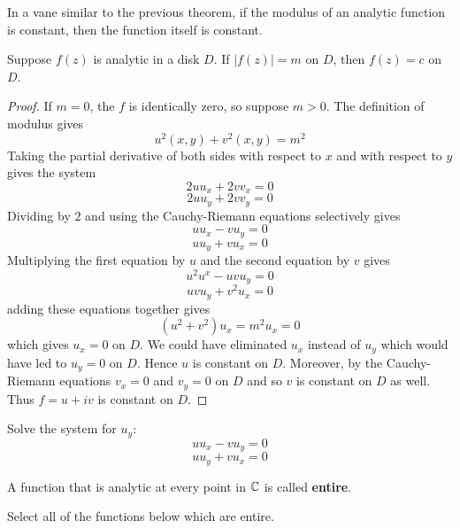 \documentclass[handout]{ximera}
\begin{document}
In a vane similar to the previous theorem, if the modulus of an analytic function is constant, 
then the function itself is constant.

\begin{theorem}
Suppose $f(z)$ is analytic in a disk $D$. If $|f(z)| = m$ on  $D$, then $f(z) =c$ on $D$.
\end{theorem}

\begin{proof}
If $m =0$, the $f$ is identically zero, so suppose $m>0$. The definition of modulus gives
\[
u^2(x,y) + v^2(x,y) = m^2
\]
Taking the partial derivative of both sides with respect to $x$ and with respect to $y$ gives the system
\[
2uu_x +2vv_x = 0
\]
\[
2uu_y + 2vv_y = 0
\]
Dividing by $2$ and using the Cauchy-Riemann equations selectively gives
\[
uu_x -vu_y = 0
\]
\[
uu_y + vu_x = 0
\]
Multiplying the first equation by $u$ and the second equation by $v$ gives
\[
u^2u^x - uvu_y=0
\]
\[
uvu_y + v^2u_x = 0
\]
adding these equations together gives
\[
\left(u^2 +v^2\right)u_x = m^2u_x = 0
\]
which gives $u_x = 0$ on $D$. We could have eliminated $u_x$ instead of $u_y$ which would 
have led to $u_y =0$ on $D$.
Hence $u$ is constant on $D$. Moreover, by the Cauchy-Riemann equations $v_x=0$ and $v_y=0$ on $D$ and 
so $v$ is constant on $D$ as well.
Thus $f = u+iv$ is constant on $D$.
\end{proof}

\begin{problem}
Solve the system for $u_y$:
\[
uu_x -vu_y = 0
\]
\[
uu_y + vu_x = 0
\]
\begin{multipleChoice}
\end{multipleChoice}
\end{problem}


\begin{definition}
A function that is analytic at every point in $\mathbb C$ is called {\bf entire}.
\end{definition}


\begin{problem}
Select all of the functions below which are entire.
\begin{selectAll}
\end{selectAll}
\end{problem}


\end{document}
